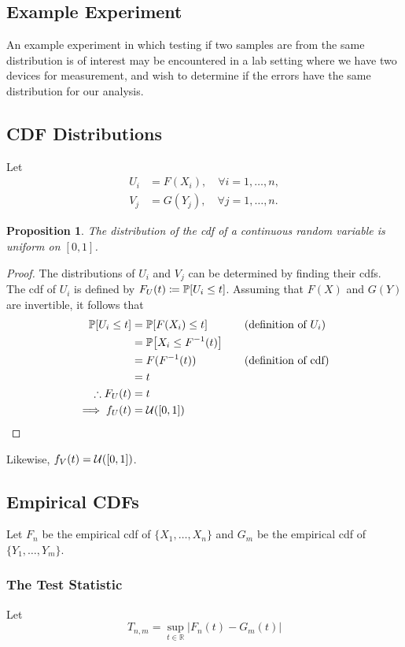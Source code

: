 \documentclass[letterpaper, reqno]{amsart}
\newtheorem{prop}{Proposition}[section]
\numberwithin{equation}{section}
\newcommand{\Prob}[1]{\mathbb{P}\mleft[#1\mright]}
\newcommand{\R}{\mathbb{R}}  %
\newcommand{\U}[2]{\mathcal{U}\mleft(\mleft[ #1, #2 \mright]\mright)}
\newcommand{\by}[1]{&\quad&\text{(#1)}}
\begin{document}
\subsection{Example Experiment}
An example experiment in which testing if two samples are from the same
distribution is of interest may be encountered in a lab setting where we have
two devices for measurement, and wish to determine if the errors have the same
distribution for our analysis. 

\subsection{CDF Distributions}
Let 
\begin{align*}
  U_i &= F(X_i), \quad \forall i = 1, \dots, n, \\
  V_j &= G(Y_j), \quad \forall j = 1, \dots, n.
\end{align*}

\begin{prop}
  The distribution of the cdf of a continuous random variable is uniform on $[0,
  1]$.
\end{prop}

\begin{proof}
The distributions of $U_i$ and $V_j$ can be determined by finding their cdfs.
The cdf of $U_i$ is defined by $F_U(t) \coloneqq \Prob{U_i \le t}$. Assuming that $F(X)$ and $G(Y)$ are invertible, it follows that
\begin{alignat*}{3}
  \Prob{U_i \le t} &= \Prob{F(X_i) \le t} \by{definition of $U_i$} \\
                   &= \Prob{X_i \le F^{-1}(t)} \\
                   &= F(F^{-1}(t)) \by{definition of cdf} \\
                   &= t \\
  \therefore F_U(t) &= t \\
  \implies f_U(t) &= \U{0}{1} \tag*{\qedhere}
\end{alignat*}
\end{proof}
Likewise, $f_V(t) = \U{0}{1}$.

\subsection{Empirical CDFs}
Let $F_n$ be the empirical cdf of $\{X_1, \dots, X_n\}$ and $G_m$ be the
empirical cdf of $\{Y_1, \dots, Y_m\}$.

\subsubsection{The Test Statistic}
Let
\begin{equation}
  T_{n,m} = \sup_{t \in \R} \left| F_n(t) - G_m(t) \right|
\end{equation}
\end{document}
